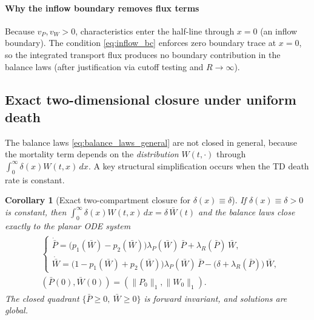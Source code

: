\documentclass[pdflatex,sn-mathphys-ay]{sn-jnl}
\theoremstyle{thmstyleone}
\newtheorem{corollary}[theorem]{Corollary}
\theoremstyle{definition}
\theoremstyle{remark}
\begin{document}
\paragraph{Why the inflow boundary removes flux terms}
Because $v_P,v_W>0$, characteristics enter the half-line through $x=0$ (an inflow boundary).
The condition \eqref{eq:inflow_bc} enforces zero boundary trace at $x=0$,
so the integrated transport flux produces no boundary contribution in the balance laws
(after justification via cutoff testing and $R\to\infty$).

\subsection{Exact two-dimensional closure under uniform death}
\label{subsec:closure_uniform_delta}
The balance laws \eqref{eq:balance_laws_general} are not closed in general, because
the mortality term depends on the \emph{distribution} $W(t,\cdot)$ through
$\int_0^\infty \delta(x)W(t,x)\,dx$. A key structural simplification occurs when the
TD death rate is constant.

\begin{corollary}[Exact two-compartment closure for $\delta(x)\equiv\delta$]
\label{cor:uniform-death-closure}
If $\delta(x)\equiv\delta>0$ is constant, then
$\int_0^\infty \delta(x)W(t,x)\,dx=\delta\,\bar W(t)$ and the balance laws close exactly to the planar ODE system
\begin{align}\label{eq:reduced_balance}
\begin{aligned}
&\begin{cases}
\displaystyle
\dot{\bar P}
=\Big(p_1(\bar W)-p_2(\bar W)\Big)\lambda_P(\bar W)\,\bar P
+\lambda_R(\bar P)\,\bar W,\\[8pt]
\displaystyle
\dot{\bar W}
=\Big(1-p_1(\bar W)+p_2(\bar W)\Big)\lambda_P(\bar W)\,\bar P
-\big(\delta+\lambda_R(\bar P)\big)\,\bar W,
\end{cases}
 \\[6pt] 
 &(\bar P(0),\bar W(0))=(\|P_0\|_1,\|W_0\|_1).
 \end{aligned}
\end{align}
The closed quadrant $\{\bar P\ge 0,\ \bar W\ge 0\}$ is forward invariant, and solutions are global.
\end{corollary}
\end{document}
